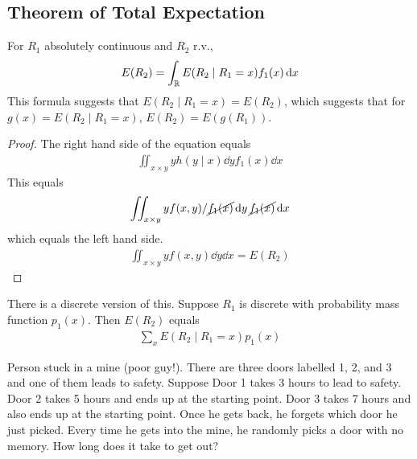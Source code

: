 \subsection{Theorem of Total Expectation}
\begin{proposition}
    For $R_1$ absolutely continuous and $R_2$ r.v.,
    \begin{align}
        E(R_2) = \int_{\mathbb{R}} E(R_2 \mid R_1 = x) f_1(x) \dd{x}
    \end{align}
    This formula suggests that $E(R_2 \mid R_1 = x) = E(R_2)$, which suggests that for $g(x) = E(R_2 \mid R_1 = x)$, $E(R_2) = E(g(R_1))$.
\end{proposition}
\begin{proof}
    The right hand side of the equation equals
    \begin{align}
        \iint_{x \times y} y h(y \mid x) \dd{y} f_1(x) \dd{x}
    \end{align}
    This equals
    \begin{align}
        \iint_{x \times y} y f(x,y)/\cancel{f_1(x)} \dd{y} \cancel{f_1(x)} \dd{x}
    \end{align}
    which equals the left hand side.
    \begin{align}
        \iint_{x \times y} y f(x,y) \dd{y} \dd{x} = E(R_2)
    \end{align}
\end{proof}
\begin{lemma}
    There is a discrete version of this. Suppose $R_1$ is discrete with probability mass function $p_1(x)$. Then $E(R_2)$ equals
    \begin{align}
        \sum_x E(R_2 \mid R_1 = x) p_1(x)
    \end{align}
\end{lemma}
\begin{example}
    Person stuck in a mine (poor guy!). There are three doors labelled 1, 2, and 3 and one of them leads to safety. Suppose Door 1 takes 3 hours to lead to safety. Door 2 takes 5 hours and ends up at the starting point. Door 3 takes 7 hours and also ends up at the starting point. Once he gets back, he forgets which door he just picked. Every time he gets into the mine, he randomly picks a door with no memory. How long does it take to get out?
\end{example}
